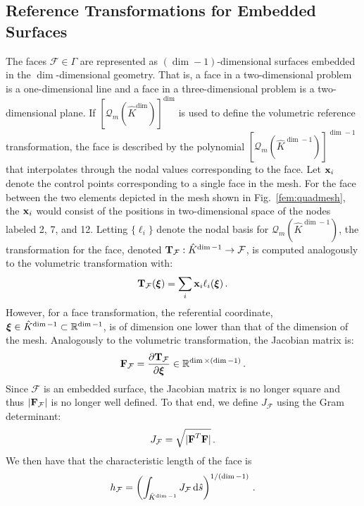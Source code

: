 \documentclass[../doc.tex]{subfiles}
\begin{document}
\subsection{Reference Transformations for Embedded Surfaces}
The faces $\mathcal{F} \in \Gamma$ are represented as $(\dim-1)$-dimensional surfaces embedded in the $\dim$-dimensional geometry. That is, a face in a two-dimensional problem is a one-dimensional line and a face in a three-dimensional problem is a two-dimensional plane. If $[\mathcal{Q}_m(\hat{K}^{\dim})]^{\dim}$ is used to define the volumetric reference transformation, the face is described by the polynomial $[\mathcal{Q}_m(\hat{K}^{\dim-1})]^{\dim-1}$ that interpolates through the nodal values corresponding to the face. 
Let $\boldsymbol{\mathrm{x}}_i$ denote the control points corresponding to a single face in the mesh. For the face between the two elements depicted in the mesh shown in Fig.~\ref{fem:quadmesh}, the $\boldsymbol{\mathrm{x}}_i$ would consist of the positions in two-dimensional space of the nodes labeled 2, 7, and 12. Letting $\{\ell_i\}$ denote the nodal basis for $\mathcal{Q}_m(\hat{K}^{\dim-1})$, the transformation for the face, denoted $\boldsymbol{\mathrm{T}}_\mathcal{F} : \hat{K}^{\dim-1} \rightarrow \mathcal{F}$, is computed analogously to the volumetric transformation with: 
	\begin{equation}
		\boldsymbol{\mathrm{T}}_\mathcal{F}(\boldsymbol{\xi}) = \sum_i \boldsymbol{\mathrm{x}}_i \ell_i(\boldsymbol{\xi}) \,. 
	\end{equation}
However, for a face transformation, the referential coordinate, $\boldsymbol{\xi} \in \hat{K}^{\dim-1} \subset \mathbb{R}^{\dim-1}$, is of dimension one lower than that of the dimension of the mesh. Analogously to the volumetric transformation, the Jacobian matrix is: 
	\begin{equation}
		\boldsymbol{\mathrm{F}}_\mathcal{F} = \frac{\partial \boldsymbol{\mathrm{T}}_\mathcal{F}}{\partial \boldsymbol{\xi}} \in \mathbb{R}^{\dim \times (\dim - 1)} \,. 
	\end{equation}
Since $\mathcal{F}$ is an embedded surface, the Jacobian matrix is no longer square and thus $|\boldsymbol{\mathrm{F}}_\mathcal{F}|$ is no longer well defined. To that end, we define $J_\mathcal{F}$ using the Gram determinant: 
	\begin{equation}
		J_\mathcal{F} = \sqrt{|\boldsymbol{\mathrm{F}}^T \boldsymbol{\mathrm{F}}|} \,. 
	\end{equation}
We then have that the characteristic length of the face is 
	\begin{equation}
		h_\mathcal{F} = \left( \int_{\hat{K}^{\dim-1}} J_\mathcal{F}\mathop{}\!\mathrm{d} \hat{s} \right)^{1/(\dim-1)} \,. 
	\end{equation}
\end{document}
